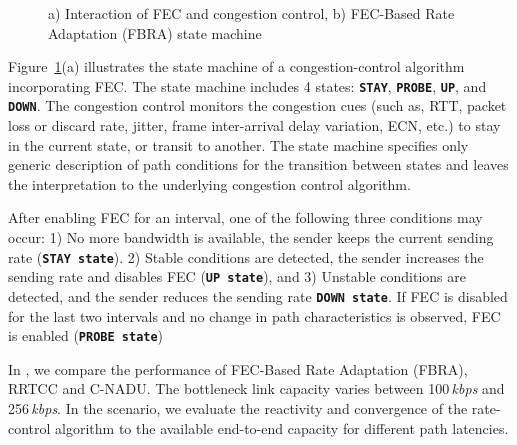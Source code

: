 
\begin{figure}
  \centerline{
}
\caption{a) Interaction of FEC and congestion control, b) FEC-Based Rate
Adaptation (FBRA) state machine }
\label{fig:fecrc-intro}
\end{figure}

Figure~\ref{fig:fecrc-intro}(a) illustrates the state machine of a
congestion-control algorithm incorporating FEC. The state machine includes 4
states: \texttt{\textbf{STAY}}, \texttt{\textbf{PROBE}}, \texttt{\textbf{UP}},
and \texttt{\textbf{DOWN}}. The congestion control monitors the congestion
cues (such as, RTT, packet loss or discard rate, jitter, frame inter-arrival
delay variation, ECN, etc.) to stay in the current state, or transit to
another. The state machine specifies only generic description of path
conditions for the transition between states and leaves the interpretation to
the underlying congestion control algorithm.

After enabling FEC for an interval, one of the following three conditions may
occur: 1) No more bandwidth is available, the sender keeps the current sending
rate (\texttt{\textbf{STAY state}}). 2) Stable conditions are detected, the
sender increases the sending rate and disables FEC (\texttt{\textbf{UP
state}}), and 3) Unstable conditions are detected, and the sender reduces the
sending rate \texttt{\textbf{DOWN state}}. If FEC is disabled for the last two
intervals and no change in path characteristics is observed, FEC is enabled
(\texttt{\textbf{PROBE state}})

In , we compare the performance of FEC-Based Rate Adaptation
(FBRA), RRTCC and C-NADU. The bottleneck link capacity varies between
100\,\emph{kbps} and 256\,\emph{kbps}. In the scenario, we evaluate the
reactivity and convergence of the rate-control algorithm to the available
end-to-end capacity for different path latencies.

